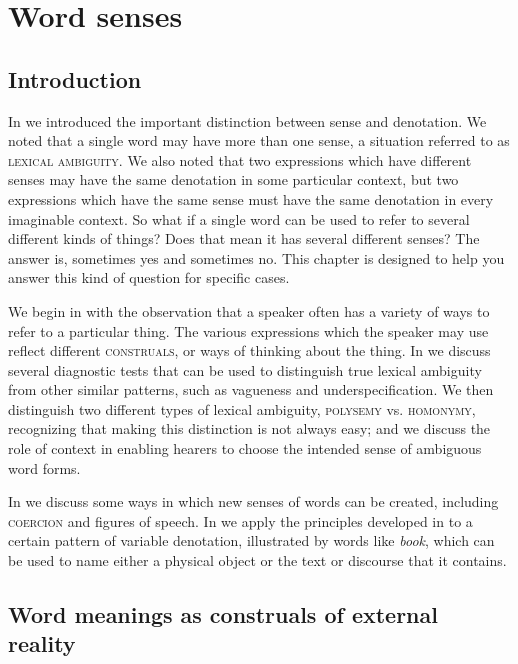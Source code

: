 \chapter{Word senses}\label{sec:5}

\section{Introduction}\label{sec:5.1}

In  we introduced the important distinction between sense and denotation. We noted that a single word may have more than one sense, a situation referred to as \textsc{lexical ambiguity}. We also noted that two expressions which have different senses may have the same denotation in some particular context, but two expressions which have the same sense must have the same denotation in every imaginable context. So what if a single word can be used to refer to several different kinds of things? Does that mean it has several different senses? The answer is, sometimes yes and sometimes no. This chapter is designed to help you answer this kind of question for specific cases.



We begin in  with the observation that a speaker often has a variety of ways to refer to a particular thing. The various expressions which the speaker may use reflect different \textsc{construals}, or ways of thinking about the thing. In  we discuss several diagnostic tests that can be used to distinguish true lexical ambiguity from other similar patterns, such as vagueness and underspecification. We then distinguish two different types of lexical ambiguity, \textsc{polysemy} vs. \textsc{homonymy}, recognizing that making this distinction is not always easy; and we discuss the role of context in enabling hearers to choose the intended sense of ambiguous word forms.



In  we discuss some ways in which new senses of words can be created, including \textsc{coercion} and figures of speech. In  we apply the principles developed in  to a certain pattern of variable denotation, illustrated by words like \textit{book}, which can be used to name either a physical object or the text or discourse that it contains.


\section{Word meanings as construals of external reality}\label{sec:5.2}

